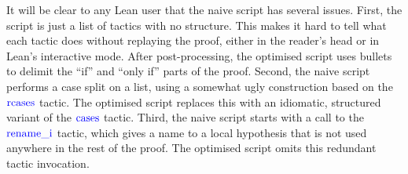 \documentclass[sigplan,10pt,anonymous,review]{acmart}
\newcommand{\tac}[1]{\ensuremath{\mathrm{\mathcolor{blue}{#1}}}}
\begin{document}
It will be clear to any Lean user that the naive script has several issues.
First, the script is just a list of tactics with no structure.
This makes it hard to tell what each tactic does without replaying the proof, either in the reader's head or in Lean's interactive mode.
After post-processing, the optimised script uses bullets to delimit the \enquote{if} and \enquote{only if} parts of the proof.
Second, the naive script performs a case split on a list, using a somewhat ugly construction based on the \tac{rcases} tactic.
The optimised script replaces this with an idiomatic, structured variant of the \tac{cases} tactic.
Third, the naive script starts with a call to the \tac{rename\_i} tactic, which gives a name to a local hypothesis that is not used anywhere in the rest of the proof.
The optimised script omits this redundant tactic invocation.
\end{document}
